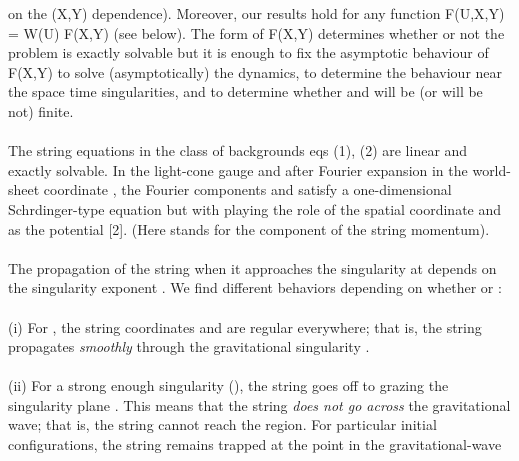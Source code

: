 \documentclass[12pt,a4paper]{article}
\begin{document}
on the (X,Y) dependence). Moreover, our results hold for any function 
F(U,X,Y) = W(U) F(X,Y) (see below). The form of F(X,Y) determines whether or 
not the problem is exactly solvable but it is enough to fix the asymptotic 
behaviour of F(X,Y) to solve (asymptotically) the dynamics, to determine the 
behaviour near the space time singularities, and to determine whether 
\coordHE{} 
and \coordHE{} will be (or will be not) finite. \\ \\
The string equations in the class of backgrounds eqs (1), (2) are linear 
and exactly 
solvable. In the light-cone gauge \coordHE{} and after Fourier 
expansion in the world-sheet coordinate \myHighlight{$\sigma $}\coordHE{}, the Fourier components 
\coordHE{} and \coordHE{} satisfy a one-dimensional 
Schr\coordHE{}dinger-type equation but with \myHighlight{$\tau $}\coordHE{} playing the 
role of the spatial coordinate and \coordHE{} as the potential 
[2]. (Here \coordHE{} stands for the \coordHE{} component of the string momentum). \\ \\
The propagation of the string when it approaches the singularity at 
\coordHE{} depends on the singularity exponent \myHighlight{$\beta $}\coordHE{} . We 
find different behaviors depending 
on whether \coordHE{} or \coordHE{} : \\ \\
(i) For \coordHE{}, the string coordinates \coordHE{} and \coordHE{} are regular 
everywhere; 
that is, the string propagates {\it smoothly} through the gravitational 
singularity \coordHE{}. \\ \\
(ii) For a strong enough singularity (\coordHE{}), the string goes off to 
\coordHE{} grazing the singularity plane \coordHE{}. This means that the 
string {\it does not go across} the gravitational wave; that is, the 
string 
cannot reach the \coordHE{} region. For particular initial configurations, the 
string remains trapped at the point \coordHE{} in the gravitational-wave 
\end{document}

